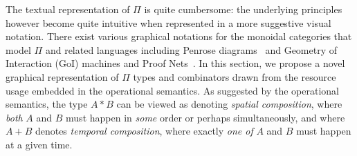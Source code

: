 \documentclass{article}
\begin{document}
The textual representation of $\Pi$ is quite cumbersome: the
underlying principles however become quite intuitive when represented
in a more suggestive visual notation. There exist various graphical
notations for the monoidal categories that model $\Pi$ and related
languages including Penrose diagrams~\cite{selinger-graphical} and
Geometry of Interaction (GoI) machines and Proof
Nets~\cite{Mackie2011,DBLP:conf/popl/Mackie95}. In this section, we
propose a novel graphical representation of $\Pi$ types and
combinators drawn from the resource usage embedded in the operational
semantics. As suggested by the operational semantics, the type $A * B$
can be viewed as denoting \emph{spatial composition}, where
\emph{both} $A$ and $B$ must happen in \emph{some} order or perhaps
simultaneously, and where $A + B$ denotes \emph{temporal composition},
where exactly \emph{one of} $A$ and $B$ must happen at a given time.
\end{document}
